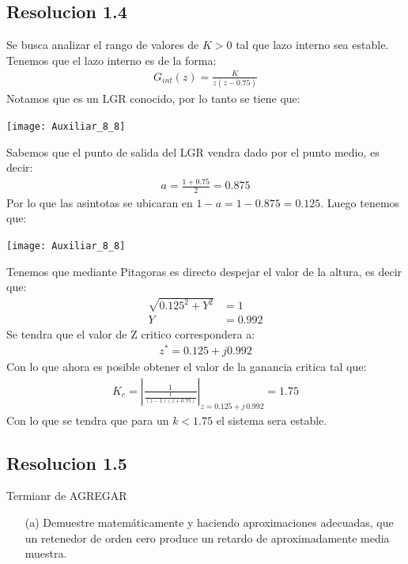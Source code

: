 \documentclass[
  11pt,
  letterpaper,
   addpoints,
  ]{exam}
\begin{document}
\begin{questions}
\begin{solution}
    \subsection*{Resolucion 1.4}
    Se busca analizar el rango de valores de $K > 0$ tal que lazo interno sea estable. Tenemos que el lazo interno es de la forma:
    \begin{align}
        G_{int}(z) = \frac{K}{z(z-0.75)}
    \end{align}
    Notamos que es un LGR conocido, por lo tanto se tiene que:
    \begin{center}
        \texttt{[image: Auxiliar\_8\_8]}
    \end{center}
    Sabemos que el punto de salida del LGR vendra dado por el punto medio, es decir:
    \begin{align}
        a= \frac{1+0.75}{2} = 0.875
    \end{align}
    Por lo que las asintotas se ubicaran en $1-a = 1-0.875 = 0.125$. Luego tenemos que:
    \begin{center}
        \texttt{[image: Auxiliar\_8\_8]}
    \end{center}
    Tenemos que mediante Pitagoras es directo despejar el valor de la altura, es decir que:
    \begin{align}
        \sqrt{0.125^{2} + Y^{2}} &= 1\\
        Y &= 0.992
    \end{align}
    Se tendra que el valor de Z critico correspondera a:
    \begin{align}
        z^{*} = 0.125 + j0.992
    \end{align}
    Con lo que ahora es posible obtener el valor de la ganancia critica tal que:
    \begin{align}
        K_{c} = \left| \frac{1}{\frac{1}{(z-1)(z+0.75)}}\right|_{z = 0.125 + j \, 0.992} = 1.75
    \end{align}
    Con lo que se tendra que para un $k< 1.75$ el sistema sera estable.
    \subsection*{Resolucion 1.5}
    Termianr de AGREGAR
\end{solution}
    \question 
    \begin{enumerate}
        \item[(a)] Demuestre matemáticamente y haciendo aproximaciones adecuadas, que un retenedor de orden cero produce un retardo de aproximadamente media muestra.
        

\end{enumerate}
\end{questions}
\end{document}

